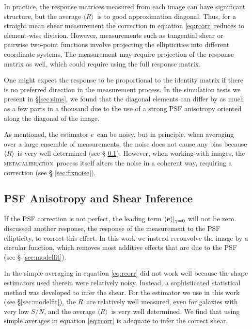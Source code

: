 \documentclass[iop, twocolappendix, appendixfloats, numberedappendix, apj]{emulateapj}
\newcommand{\snr}{$S/N$}
\newcommand{\vest}{\mbox{\boldmath $e$}}
\newcommand{\mcal}{\textsc{metacalibration}}
\newcommand{\mcalR}{\mbox{\boldmath $R$}}
\newcommand{\mcalRmean}{\mbox{\boldmath $\langle R \rangle$}}
\begin{document}
In practice, the response matrices measured from each image can have
significant structure, but the average \mcalRmean\ is to good approximation
diagonal.  Thus, for a straight mean shear measurement the correction in
equation \ref{eq:rcorr} reduces to element-wise division.  However,
measurements such as tangential shear or pairwise two-point functions involve
projecting the ellipticities into different coordinate systems. The measurement
may require projection of the response matrix as well, which could require
using the full response matrix.

One might expect the response to be proportional to the identity matrix if
there is no preferred direction in the measurement process.  In the simulation
tests we present in \S \ref{sec:sims}, we found that the diagonal elements can
differ by as much as a few parts in a thousand due to the use of a strong PSF
anisotropy oriented along the diagonal of the image.

As mentioned, the estimator \vest\ can be noisy, but in principle, when
averaging over a large ensemble of measurements, the noise does not cause any
bias because \mcalRmean\ is very well determined (see \S
\ref{sec:differences}).  However, when working with images, the \mcal\ process
itself alters the noise in a coherent way, requiring a correction (see \S
\ref{sec:fixnoise}).


\subsection{PSF Anisotropy and Shear Inference}  \label{sec:differences}

If the PSF correction is not perfect, the leading term $\langle \vest
\rangle|_{\gamma=0}$ will not be zero.  \cite{HuffMcal} discussed another
response, the response of the measurement to the PSF ellipticity, to correct
this effect.  In this work we instead reconvolve the image by a circular
function, which removes most additive effects that are due to the PSF  (see \S
\ref{sec:modelfit}).

In \cite{HuffMcal} the simple averaging in equation \ref{eq:rcorr} did not work
well because the shape estimators used  therein were relatively noisy.
Instead, a sophisticated statistical method was developed to infer the shear.
For the estimator we use in this work (see \S \ref{sec:modelfit}), the \mcalR\
are relatively well measured, even for galaxies with very low \snr, and the average
\mcalRmean\ is very well determined. We find that using simple averages in
equation \ref{eq:rcorr} is adequate to infer the correct shear. 
\end{document}
